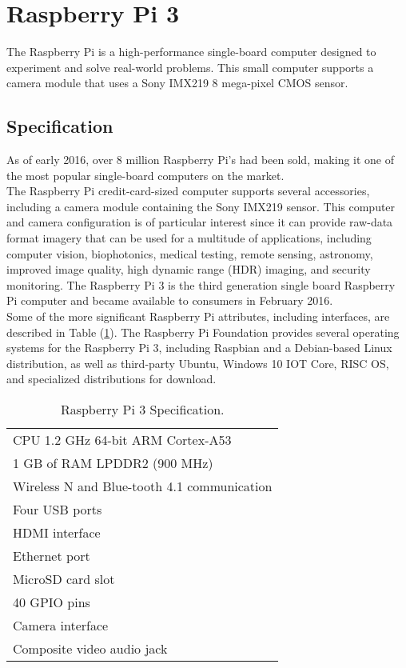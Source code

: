 \section{Raspberry Pi 3}
\label{sec:raspi3}
The Raspberry Pi is a high-performance single-board computer designed to
experiment and solve real-world problems. This small computer supports a camera
module that uses a Sony IMX219 8 mega-pixel CMOS sensor.
%
\subsection{Specification}
\label{ssec:raspispecification}
As of early 2016, over 8 million Raspberry Pi's had been sold, making it one of
the most popular single-board computers on the
market.\cite{upton2016raspberry}\\ The Raspberry Pi credit-card-sized computer
supports several accessories, including a camera module containing the Sony
IMX219 sensor. This computer and camera configuration is of particular interest
since it can provide raw-data format imagery that can be used for a multitude of
applications, including computer vision, biophotonics, medical testing, remote
sensing, astronomy, improved image quality, high dynamic range (HDR) imaging,
and security monitoring. The Raspberry Pi 3 is the third generation single board
Raspberry Pi computer and became available to consumers in February 2016. \\Some
of the more significant Raspberry Pi attributes, including interfaces, are
described in Table (\ref{tab:rapberryattributes}). The Raspberry
Pi Foundation provides several operating systems for the  Raspberry Pi 3,
including Raspbian and a Debian-based Linux distribution, as  well as
third-party Ubuntu, Windows 10 IOT Core, RISC OS, and specialized  distributions
for download.\cite{10.1117/1.JEI.26.1.013014}
%
\begin{table}[htb]
\centering
	\caption{Raspberry Pi 3 Specification.}
	\label{tab:rapberryattributes}
	\begin{tabular}{l}
		\hline
		\rowcolor{aliceblue!85}CPU 1.2 \si{\giga\hertz} 64-bit ARM Cortex-A53 \\
		1 GB of RAM LPDDR2 (900 \si{\mega\hertz}) \\
		\rowcolor{aliceblue!85}Wireless N and Blue-tooth 4.1 communication\\
		Four USB ports\\
		\rowcolor{aliceblue!85}HDMI interface\\
		Ethernet port\\
		\rowcolor{aliceblue!85}MicroSD card slot\\
		40 GPIO pins\\
		\rowcolor{aliceblue!85}Camera interface\\
		Composite video audio jack\\
		\hline
\end{tabular}
\end{table}
%

